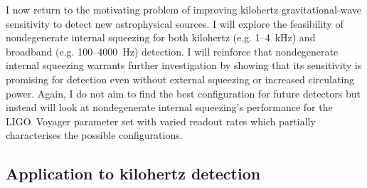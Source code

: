 I now return to the motivating problem of improving kilohertz gravitational-wave sensitivity to detect new astrophysical sources. I will explore the feasibility of nondegenerate internal squeezing for both kilohertz (e.g. 1--4~kHz) and broadband (e.g. 100--4000~Hz) detection. I will reinforce that nondegenerate internal squeezing warrants further investigation by showing that its sensitivity is promising for detection even without external squeezing or increased circulating power. Again, I do not aim to find the best configuration for future detectors but instead will look at nondegenerate internal squeezing's performance for the LIGO~Voyager parameter set with varied readout rates which partially characterises the possible configurations.


\subsection{Application to kilohertz detection}
\label{sec:nIS_kHz}

